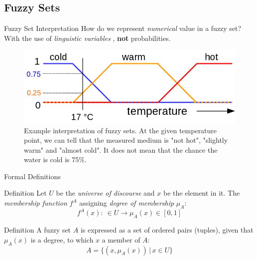 \documentclass[hyperref={unicode}]{beamer}
\begin{document}
\subsection{Fuzzy Sets}


\begin{frame}{Fuzzy Set Interpretation}
	How do we represent \textit{numerical} value in a fuzzy set? With the use of \textit{linguistic variables} \cite{lieb1993linguistic}, \textbf{not} probabilities.
	\begin{figure}
		\includegraphics[width=.75\textwidth]{fuzzy-set-degrees.jpg}
		\caption{Example interpretation of fuzzy sets. At the given temperature point, we can tell that the measured medium is "not hot", "slightly warm" and "almost cold". It does not mean that the chance the water is cold is 75\%.
		\label{fig:fuzzy-set}}
	\end{figure}
\end{frame}

\begin{frame}{Formal Definitions}
	\begin{block}{Definition}
		Let $U$ be the \textit{universe of discourse} and $x$ be the element in it. The \textit{membership function} $f^A$ assigning \textit{degree of membership} $\mu_A$:
		$$f^A(x): \: \in U \rightarrow \mu_A(x) \in [0,1]$$
	\end{block}
	\begin{block}{Definition}
		A fuzzy set $A$ is expressed as a set of ordered pairs (tuples), given that $\mu_A(x)$ is a degree, to which $x$ a member of $A$:
	$$A=\{(x,\mu_A(x))\,|\,x \in U\}$$
	\end{block}
\end{frame}
\end{document}
